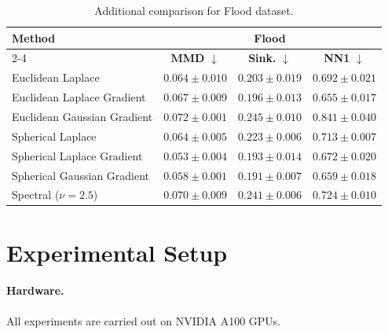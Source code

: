 \documentclass{article}
\theoremstyle{plain}
\newcommand{\best}[1]{\cellcolor{bestblue}#1}
\newcommand{\second}[1]{\cellcolor{secondblue}#1}
\newcommand{\third}[1]{\cellcolor{thirdgrayblue}#1}
\begin{document}
\newpage
\begin{table}[h!]
\centering
\small
\setlength{\tabcolsep}{6pt}
\renewcommand{\arraystretch}{1.15}
\begin{tabular}{lccc}
\toprule
\textbf{Method} 
& \multicolumn{3}{c}{\textbf{Flood}} \\
\cmidrule(lr){2-4} 
& \textbf{MMD} $\downarrow$ & \textbf{Sink.} $\downarrow$ & \textbf{NN1} $\downarrow$\\
\midrule
Euclidean Laplace {\tiny \cite{Deng_2026_Drift}}
& $0.064 \pm 0.010$ & $0.203 \pm 0.019$ & $0.692 \pm 0.021$ \\
\midrule
Euclidean Laplace Gradient
& $0.067 \pm 0.009$ & \third{$0.196 \pm 0.013$}& \best{$0.655 \pm 0.017$} \\
Euclidean Gaussian Gradient
& $0.072 \pm 0.001$ & $0.245 \pm 0.010$ & $0.841 \pm 0.040$ \\
Spherical Laplace
& \third{$0.064 \pm 0.005$} & $0.223 \pm 0.006$ & $0.713 \pm 0.007$ \\
Spherical Laplace Gradient
& \best{$0.053 \pm 0.004$} & \second{$0.193 \pm 0.014$} & \third{$0.672 \pm 0.020$} \\
Spherical Gaussian Gradient
& \second{$0.058 \pm 0.001$} & \best{$0.191 \pm 0.007$} & \second{$0.659 \pm 0.018$} \\
Spectral ($\nu = 2.5$)
& $0.070 \pm 0.009$ & $0.241 \pm 0.006$ & $0.724 \pm 0.010$ \\

\bottomrule
\end{tabular}
\caption{Additional comparison for Flood dataset.
}
\label{tab:flood-full}
\end{table}

\section{Experimental Setup}
\label{app:exp-setup}

\paragraph{Hardware.}
All experiments are carried out on NVIDIA A100 GPUs.
\end{document}
